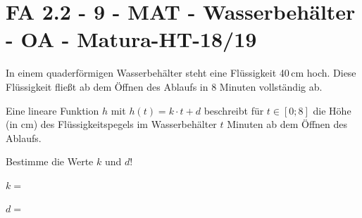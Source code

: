 \section{FA 2.2 - 9 - MAT - Wasserbehälter - OA - Matura-HT-18/19}

\begin{beispiel}[FA 2.2]{1}
In einem quaderförmigen Wasserbehälter steht eine Flüssigkeit 40\,cm hoch. Diese Flüssigkeit fließt ab dem Öffnen des Ablaufs in 8 Minuten vollständig ab.

Eine lineare Funktion $h$ mit $h(t)=k\cdot t+d$ beschreibt für $t\in[0;8]$ die Höhe (in cm) des Flüssigkeitspegels im Wasserbehälter $t$ Minuten ab dem Öffnen des Ablaufs.

Bestimme die Werte $k$ und $d$!\leer

$k=$\,\leer

$d=$\,
\end{beispiel}